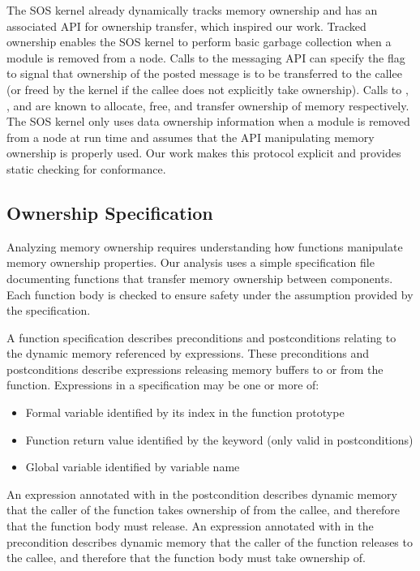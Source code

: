 The SOS kernel already dynamically tracks memory ownership and has an
associated API for ownership transfer, which inspired our work.  
%
Tracked ownership enables the SOS kernel to perform basic garbage collection
when a module is removed from a node.
%
Calls to the messaging API can specify the  flag to
signal that ownership of the posted message is to be transferred to the callee
(or freed by the kernel if the callee does not explicitly take ownership).  
%
Calls to , , and 
are known to allocate, free, and transfer ownership of memory respectively.
%
The SOS kernel only uses data ownership information when a module is removed
from a node at run time and assumes that the API manipulating memory ownership
is properly used.
%
Our work makes this protocol explicit and provides static checking for
conformance.



\subsection{Ownership Specification}


%  
%  



Analyzing memory ownership requires understanding how functions manipulate
memory ownership properties.
%
Our analysis uses a simple specification file documenting functions that
transfer memory ownership between components.
%
Each function body is checked to ensure safety under the assumption provided
by the specification.  



A function specification describes preconditions and postconditions relating
to the dynamic memory referenced by expressions.
%
These preconditions and postconditions describe expressions releasing
memory buffers to or from the function.
%
Expressions in a specification may be one or more of: 
%
\begin{itemize}
%
\item Formal variable identified by its index in the function prototype
%
\item Function return value identified by the keyword  (only
valid in postconditions)
%
\item Global variable identified by variable name
%
\end{itemize}
%
An expression annotated with  in the postcondition describes dynamic
memory that the caller of the function takes ownership of from the callee, and
therefore that the function body must release.
%
An expression annotated with  in the precondition describes dynamic
memory that the caller of the function releases to the callee, and therefore
that the function body must take ownership of.



